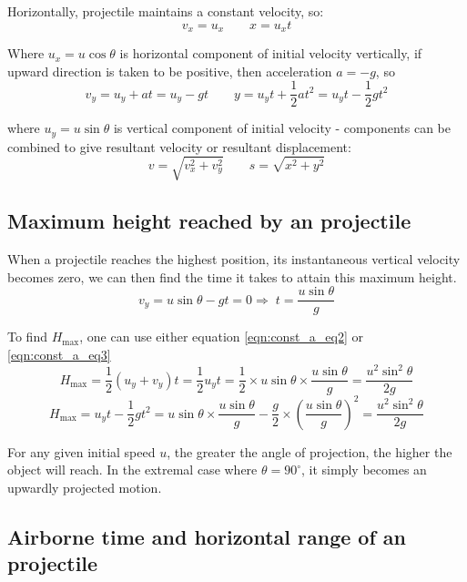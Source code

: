 \documentclass[a4paper,12pt]{book}
\newcommand{\tmax}{\text{max}}
\newcommand{\RA}{\Rightarrow\;}
\begin{document}
Horizontally, projectile maintains a constant velocity, so:
\begin{equation*}
v_x = u_x \qquad x=u_x t
\end{equation*}

Where $u_x = u\cos\theta$ is horizontal component of initial velocity vertically, if upward direction is taken to be positive, then acceleration $a=-g$, so
\begin{equation*}
v_y = u_y + at = u_y - gt  \qquad y = u_y t + \frac{1}{2}at^2 = u_y t - \frac{1}{2}gt^2
\end{equation*}

where $u_y = u\sin\theta$ is vertical component of initial velocity - components can be combined to give resultant velocity or resultant displacement:
\begin{equation*}
 v = \sqrt{v_x^2 + v_y^2} \qquad s = \sqrt{x^2 + y^2}
\end{equation*}

\subsection*{Maximum height reached by an projectile}

When a projectile reaches the highest position, its instantaneous vertical velocity becomes zero, we can then find the time it takes to attain this maximum height.
\begin{equation*}
	v_y = u\sin\theta - gt = 0 \RA t = \frac{u\sin\theta}{g}
\end{equation*}
	
To find $H_\tmax$, one can use either equation \eqref{eqn:const_a_eq2} or \eqref{eqn:const_a_eq3} 
	\begin{equation*}
	H_\tmax = \frac{1}{2}(u_y+v_y) t = \frac{1}{2}u_y t = \frac{1}{2} \times u \sin\theta \times \frac{u\sin\theta}{g} = \frac{u^2 \sin^2\theta}{2g}
	\end{equation*}
	\begin{equation*}
	H_\tmax = u_y t - \frac{1}{2}gt^2 = u \sin\theta \times \frac{u\sin\theta}{g} - \frac{g}{2} \times \left(\frac{u\sin\theta}{g}\right)^2 = \frac{u^2 \sin^2\theta}{2g}
	\end{equation*}

For any given initial speed $u$, the greater the angle of projection, the higher the object will reach. In the extremal case where $\theta = 90 ^\circ$, it simply becomes an upwardly projected motion.

\subsection*{Airborne time and horizontal range of an projectile}
\end{document}
